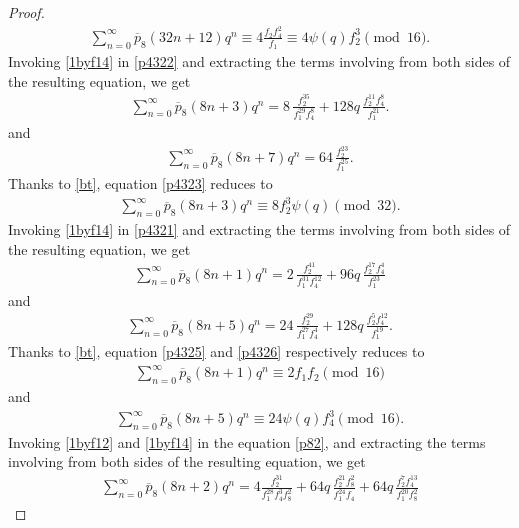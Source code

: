 \documentclass[11pt, reqno]{amsart}
\numberwithin{equation}{section}
\begin{document}
\begin{proof}
\begin{align}
			\sum_{n=0}^{\infty}\overline{p}_{8}(32n+12)q^n\equiv4\frac{f_2f_4^{2}}{f_1}\equiv 4 \psi(q)f_2^3\pmod{16}.\label{p814}
		\end{align}
		Invoking \eqref{1byf14} in \eqref{p4322} and extracting the terms involving from both sides of the resulting equation, we get
		\begin{align}
			\sum_{n=0}^{\infty}\overline{p}_{8}(8n+3)q^n=8\,\frac{f_2^{35}}{f_1^{29}f_4^8}+
			128q\,\frac{f_2^{11}f_4^8}{f_1^{21}}.\label{p4323}
		\end{align} and
		\begin{align}
			\sum_{n=0}^{\infty}\overline{p}_{8}(8n+7)q^n=
			64\,\frac{f_2^{23}}{f_1^{25}}.\label{p4324}
		\end{align}
		Thanks to \eqref{bt}, equation \eqref{p4323} reduces to 
		\begin{align}
			\sum_{n=0}^{\infty}\overline{p}_{8}(8n+3)q^n\equiv8f_2^3 \psi(q)\pmod{32}.\label{p43231}
		\end{align}
		Invoking \eqref{1byf14} in \eqref{p4321} and extracting the terms involving from both sides of the resulting equation, we get
		\begin{align}
			\sum_{n=0}^{\infty}\overline{p}_{8}(8n+1)q^n=2\,\frac{f_2^{41}}{f_1^{31}f_4^{12}}+96q\,\frac{f_2^{17}f_4^4}{f_1^{23}}\label{p4325}
		\end{align}
		and 
		\begin{align}
			\sum_{n=0}^{\infty}\overline{p}_{8}(8n+5)q^n=
			24\,\frac{f_2^{29}}{f_1^{27}f_4^4}+ 128q\,\frac{f_2^{5}f_4^{12}}{f_1^{19}}.\label{p4326}
		\end{align}
		Thanks to \eqref{bt}, equation \eqref{p4325} and  \eqref{p4326} respectively reduces to
		\begin{align}
			\sum_{n=0}^{\infty}\overline{p}_{8}(8n+1)q^n\equiv2f_1f_2\pmod{16}\label{p43251}
		\end{align}
		and
		\begin{align}
			\sum_{n=0}^{\infty}\overline{p}_{8}(8n+5)q^n\equiv24\psi(q)f_4^3\pmod{16}\label{p43252}.
		\end{align}
		Invoking \eqref{1byf12} and \eqref{1byf14} in the equation \eqref{p82}, and extracting the terms 
		involving from both sides of the resulting equation, we get
		\begin{align}
			\sum_{n=0}^{\infty}\overline{p}_{8}(8n+2)q^n=4\frac{f_2^{31}}{f_1^{28}f_4^3 f_{8}^2} 
			+ 64q\,\frac{f_2^{21}f_{8}^2}{f_1^{24}f_4} 
			+ 64q\,\frac{f_2^7 f_4^{13}}{f_1^{20}f_{8}^2} 
			\label{p8201}
		\end{align}

\end{proof}
\end{document}
